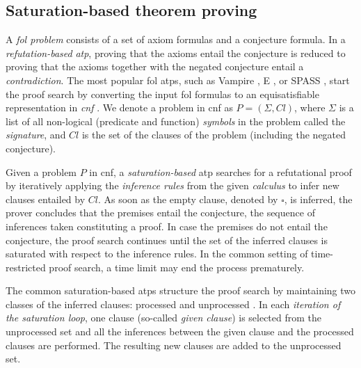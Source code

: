


\subsection{Saturation-based theorem proving}
\label{sec:saturation}

A \emph{\acrfull{fol} problem} consists of a set of axiom formulas and a conjecture formula.
In a \emph{refutation-based} \emph{\acrfull{atp}},
proving that the axioms entail the conjecture
is reduced to proving that the axioms together with the negated conjecture entail a \emph{contradiction}.
The most popular \gls{fol} \glspl{atp}, such as Vampire \cite{10.1007/978-3-642-39799-8_1}, E \cite{10.1007/978-3-030-29436-6_29}, or SPASS \cite{DBLP:conf/cade/WeidenbachDFKSW09},
start the proof search by converting the input \gls{fol} formulas to an equisatisfiable representation in 
\emph{\acrfull{cnf}} \cite{DBLP:books/el/RV01/NonnengartW01,Harrison2009}.
We denote a problem in \gls{cnf} as $P = (\Sigma, \mathit{Cl})$,
where $\Sigma$ is a list of all non-logical (predicate and function)
\emph{symbols} in the problem called the \emph{signature},
and $\mathit{Cl}$ is the set of the clauses of the problem (including the negated conjecture).

Given a problem $P$ in \gls{cnf},
a \emph{saturation-based} \gls{atp} searches for a refutational proof
by iteratively applying the \emph{inference rules} from the given \emph{calculus}
to infer new clauses entailed by $\mathit{Cl}$.
As soon as the empty clause, denoted by $\square$, is inferred,
the prover concludes that the premises entail the conjecture,
the sequence of inferences taken constituting a proof.
In case the premises do not entail the conjecture,
the proof search continues until
the set of the inferred clauses is saturated with respect to the inference rules.
In the common setting of time-restricted proof search, a time limit may end the process prematurely.

The common saturation-based \glspl{atp} structure the proof search
by maintaining two classes of the inferred clauses: processed and unprocessed \cite{10.1007/978-3-030-29436-6_29}.
In each \emph{iteration of the saturation loop}, one clause (so-called \emph{given clause})
is selected from the unprocessed set
and all the inferences between the given clause and the processed clauses are performed.
The resulting new clauses are added to the unprocessed set.

